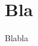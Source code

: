 \documentclass[11pt,a4paper]{article}
\begin{document}
 


\pagestyle{fancy}
 


\section{Bla}

Blabla
\end{document}
